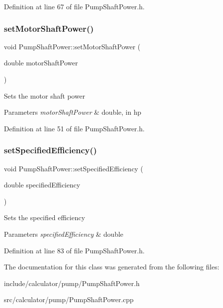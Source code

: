 Definition at line 67 of file Pump\+Shaft\+Power.\+h.

\mbox{\label{class_pump_shaft_power_a77b8c621c7c92841dbd00112437c413b}} 
\subsubsection{\texorpdfstring{set\+Motor\+Shaft\+Power()}{setMotorShaftPower()}}
{\footnotesize\ttfamily void Pump\+Shaft\+Power\+::set\+Motor\+Shaft\+Power (\begin{DoxyParamCaption}\item[{double}]{motor\+Shaft\+Power }\end{DoxyParamCaption})\hspace{0.3cm}{\ttfamily [inline]}}

Sets the motor shaft power 
\begin{DoxyParams}{Parameters}
{\em motor\+Shaft\+Power} & double, in hp \\
\hline
\end{DoxyParams}


Definition at line 51 of file Pump\+Shaft\+Power.\+h.

\mbox{\label{class_pump_shaft_power_a7d2c64ba11fb287d9b46f7d0890ee988}} 
\subsubsection{\texorpdfstring{set\+Specified\+Efficiency()}{setSpecifiedEfficiency()}}
{\footnotesize\ttfamily void Pump\+Shaft\+Power\+::set\+Specified\+Efficiency (\begin{DoxyParamCaption}\item[{double}]{specified\+Efficiency }\end{DoxyParamCaption})\hspace{0.3cm}{\ttfamily [inline]}}

Sets the specified efficiency 
\begin{DoxyParams}{Parameters}
{\em specified\+Efficiency} & double \\
\hline
\end{DoxyParams}


Definition at line 83 of file Pump\+Shaft\+Power.\+h.



The documentation for this class was generated from the following files\+:\begin{DoxyCompactItemize}
\item 
include/calculator/pump/Pump\+Shaft\+Power.\+h\item 
src/calculator/pump/Pump\+Shaft\+Power.\+cpp\end{DoxyCompactItemize}
